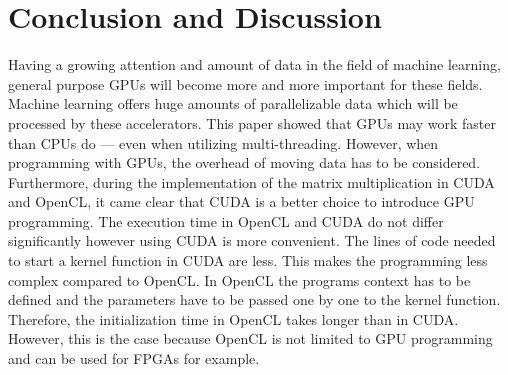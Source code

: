 \section{Conclusion and Discussion}
Having a growing attention and amount of data in the field of machine learning, general purpose GPUs will become more and more important for these fields.
Machine learning offers huge amounts of parallelizable data which will be processed by these accelerators.
This paper showed that GPUs may work faster than CPUs do --- even when utilizing multi-threading.
However, when programming with GPUs, the overhead of moving data has to be considered.
Furthermore, during the implementation of the matrix multiplication in CUDA and OpenCL, it came clear that CUDA is a better choice to introduce GPU programming.
The execution time in OpenCL and CUDA do not differ significantly however using CUDA is more convenient.
The lines of code needed to start a kernel function in CUDA are less.
This makes the programming less complex compared to OpenCL.
In OpenCL the programs context has to be defined and the parameters have to be passed one by one to the kernel function.
Therefore, the initialization time in OpenCL takes longer than in CUDA.
However, this is the case because OpenCL is not limited to GPU programming and can be used for FPGAs for example.

